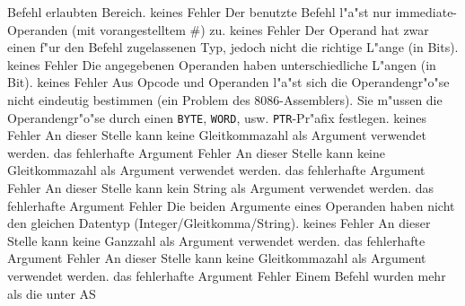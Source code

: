 \documentclass[12pt,a4paper,twoside]{report}
\newcommand{\tty}[1]{{\tt #1}}
\begin{document}
\begin{description}
{                Befehl erlaubten Bereich.}
               {keines}
               {Fehler}
               {Der benutzte Befehl l"a"st nur
                immediate-Operanden (mit vorangestelltem \#) zu.}
               {keines}
               {Fehler}
               {Der Operand hat zwar einen f"ur den Befehl
                zugelassenen Typ, jedoch nicht die richtige L"ange (in
                Bits).}
               {keines}
               {Fehler}
               {Die angegebenen Operanden haben unterschiedliche
                L"angen (in Bit).}
               {keines}
               {Fehler}
               {Aus Opcode und Operanden l"a"st sich die
                Operandengr"o"se nicht eindeutig bestimmen (ein Problem
                des 8086-Assemblers).  Sie m"ussen die Operandengr"o"se
                durch einen \tty{BYTE}, \tty{WORD}, usw. \tty{PTR}-Pr"afix
	        festlegen.}
               {keines}
               {Fehler}
               {An dieser Stelle kann keine Gleitkommazahl als Argument
                verwendet werden.}
               {das fehlerhafte Argument}
               {Fehler}
               {An dieser Stelle kann keine Gleitkommazahl als Argument
                verwendet werden.}
               {das fehlerhafte Argument}
               {Fehler}
               {An dieser Stelle kann kein String als Argument
                verwendet werden.}
               {das fehlerhafte Argument}
               {Fehler}
               {Die beiden Argumente eines Operanden haben nicht
                den gleichen Datentyp (Integer/Gleitkomma/String).}
               {keines}
               {Fehler}
               {An dieser Stelle kann keine Ganzzahl als Argument
                verwendet werden.}
               {das fehlerhafte Argument}
               {Fehler}
               {An dieser Stelle kann keine Gleitkommazahl als Argument
                verwendet werden.}
               {das fehlerhafte Argument}
               {Fehler}
               {Einem Befehl wurden mehr als die unter AS
}
\end{description}
\end{document}
